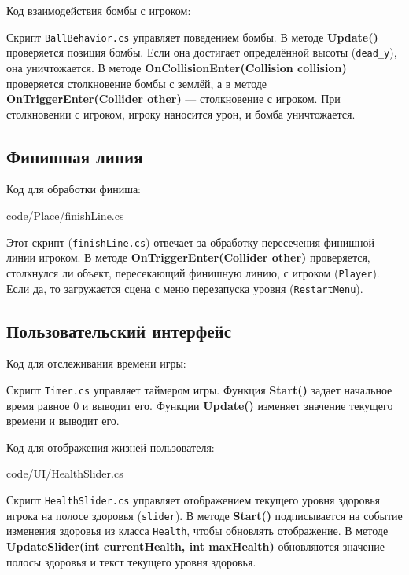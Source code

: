 Код взаимодействия бомбы с игроком:                                            


Скрипт \texttt{BallBehavior.cs} управляет поведением бомбы.
В методе \textbf{Update()} проверяется позиция бомбы.
Если она достигает определённой высоты (\texttt{dead\_y}), она уничтожается.
В методе \textbf{OnCollisionEnter(Collision collision)}
проверяется столкновение бомбы с землёй,
а в методе \textbf{OnTriggerEnter(Collider other)} --- столкновение с игроком.
При столкновении с игроком, игроку наносится урон, и бомба уничтожается.

\subsection{Финишная линия}

Код для обработки финиша:

{code/Place/finishLine.cs}

Этот скрипт (\texttt{finishLine.cs}) отвечает за обработку пересечения
финишной линии игроком. В методе \textbf{OnTriggerEnter(Collider other)}
проверяется, столкнулся ли объект, пересекающий финишную линию,
с игроком (\texttt{Player}).
Если да, то загружается сцена с меню перезапуска уровня (\texttt{RestartMenu}).

\subsection{Пользовательский интерфейс}

Код для отслеживания времени игры:                                       


Скрипт \texttt{Timer.cs} управляет таймером игры.
Функция \textbf{Start()} задает начальное время равное 0 и выводит его.
Функции \textbf{Update()} изменяет значение текущего времени и выводит его.

Код для отображения жизней пользователя:

	{code/UI/HealthSlider.cs}

Скрипт \texttt{HealthSlider.cs} управляет отображением текущего уровня
здоровья игрока на полосе здоровья (\texttt{slider}).
В методе \textbf{Start()} подписывается на событие изменения здоровья
из класса \texttt{Health}, чтобы обновлять отображение.
В методе \textbf{UpdateSlider(int currentHealth, int maxHealth)}
обновляются значение полосы здоровья и текст текущего уровня здоровья.

